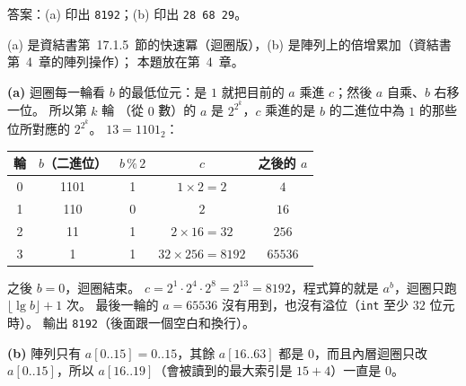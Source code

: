 \begin{pastsoln}
答案：(a) 印出 \texttt{8192}；(b) 印出 \texttt{28 68 29}。

(a) 是資結書第~17.1.5~節的快速冪（迴圈版），(b) 是陣列上的倍增累加（資結書第~4~章的陣列操作）；
本題放在第~4~章。

\textbf{(a)} 迴圈每一輪看 $b$ 的最低位元：是 $1$ 就把目前的 $a$ 乘進 $c$；然後 $a$ 自乘、$b$ 右移一位。 所以第 $k$ 輪
（從 $0$ 數）的 $a$ 是 $2^{2^k}$，$c$ 乘進的是 $b$ 的二進位中為 $1$ 的那些位所對應的 $2^{2^k}$。 $13 = 1101_2$：
\begin{center}
\begin{tabular}{ccccc}
\toprule
輪 & $b$（二進位） & $b \,\%\, 2$ & $c$ & 之後的 $a$ \\
\midrule
0 & 1101 & 1 & $1 \times 2 = 2$ & $4$ \\
1 & 110 & 0 & $2$ & $16$ \\
2 & 11 & 1 & $2 \times 16 = 32$ & $256$ \\
3 & 1 & 1 & $32 \times 256 = 8192$ & $65536$ \\
\bottomrule
\end{tabular}
\end{center}
之後 $b = 0$，迴圈結束。 $c = 2^{1} \cdot 2^{4} \cdot 2^{8} = 2^{13} = 8192$，程式算的就是 $a^b$，迴圈只跑
$\lfloor \lg b \rfloor + 1$ 次。 最後一輪的 $a = 65536$ 沒有用到，也沒有溢位（\texttt{int} 至少 $32$ 位元時）。
輸出 \texttt{8192}（後面跟一個空白和換行）。

\textbf{(b)} 陣列只有 $a[0..15] = 0..15$，其餘 $a[16..63]$ 都是 $0$，而且內層迴圈只改 $a[0..15]$，所以
$a[16..19]$（會被讀到的最大索引是 $15 + 4$）一直是 $0$。


\end{pastsoln}
